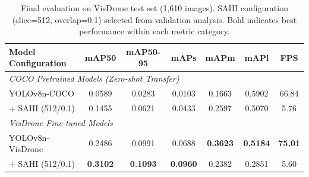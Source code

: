 \begin{table}[ht]
    \centering
    \caption{Final evaluation on VisDrone test set (1,610 images). SAHI configuration (slice=512, overlap=0.1) selected from validation analysis. Bold indicates best performance within each metric category.}
    \label{tab:final_evaluation_clean}
    \setlength{\tabcolsep}{3.5pt}
    \renewcommand{\arraystretch}{1.1}
    \begin{tabular}{|l|c|c|c|c|c|c|}
        \hline
        \textbf{Model Configuration} & \textbf{mAP50} & \textbf{mAP50-95} & \textbf{mAPs} & \textbf{mAPm} & \textbf{mAPl} & \textbf{FPS} \\
        \hline
        \hline
        \multicolumn{7}{|l|}{\textit{COCO Pretrained Models (Zero-shot Transfer)}} \\
        \hline
        YOLOv8n-COCO & 0.0589 & 0.0283 & 0.0103 & 0.1663 & 0.5902 & 66.84 \\
        \quad + SAHI (512/0.1) & 0.1455 & 0.0621 & 0.0433 & 0.2597 & 0.5070 & 5.76 \\
        \hline
        \multicolumn{7}{|l|}{\textit{VisDrone Fine-tuned Models}} \\
        \hline
        YOLOv8n-VisDrone & 0.2486 & 0.0991 & 0.0688 & \textbf{0.3623} & \textbf{0.5184} & \textbf{75.01} \\
        \quad + SAHI (512/0.1) & \textbf{0.3102} & \textbf{0.1093} & \textbf{0.0960} & 0.2382 & 0.2851 & 5.60 \\
        \hline
    \end{tabular}
\end{table}

